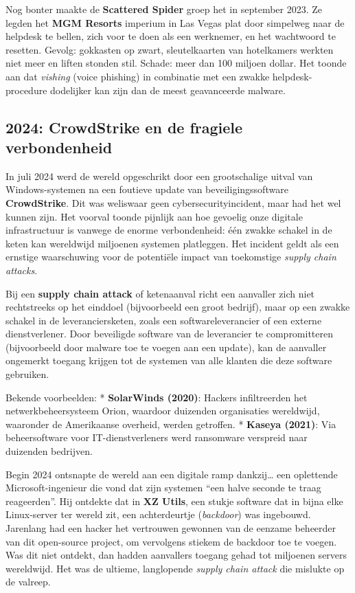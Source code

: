\documentclass[
  10pt,
  dutch,
  paper=a4,
  ,captions=tableheading
]{scrbook}
\begin{document}
Nog bonter maakte de \textbf{Scattered Spider} groep het in september
2023. Ze legden het \textbf{MGM Resorts} imperium in Las Vegas plat door
simpelweg naar de helpdesk te bellen, zich voor te doen als een
werknemer, en het wachtwoord te resetten. Gevolg: gokkasten op zwart,
sleutelkaarten van hotelkamers werkten niet meer en liften stonden stil.
Schade: meer dan 100 miljoen dollar. Het toonde aan dat \emph{vishing}
(voice phishing) in combinatie met een zwakke helpdesk-procedure
dodelijker kan zijn dan de meest geavanceerde malware.

\subsection{2024: CrowdStrike en de fragiele
verbondenheid}\label{crowdstrike-en-de-fragiele-verbondenheid}

In juli 2024 werd de wereld opgeschrikt door een grootschalige uitval
van Windows-systemen na een foutieve update van beveiligingssoftware
\textbf{CrowdStrike}. Dit was weliswaar geen cybersecurityincident, maar
had het wel kunnen zijn. Het voorval toonde pijnlijk aan hoe gevoelig
onze digitale infrastructuur is vanwege de enorme verbondenheid: één
zwakke schakel in de keten kan wereldwijd miljoenen systemen platleggen.
Het incident geldt als een ernstige waarschuwing voor de potentiële
impact van toekomstige \emph{supply chain attacks}.

\begin{tipblock}
Bij een \textbf{supply chain attack} of ketenaanval richt een aanvaller
zich niet rechtstreeks op het einddoel (bijvoorbeeld een groot bedrijf),
maar op een zwakke schakel in de leveranciersketen, zoals een
softwareleverancier of een externe dienstverlener. Door beveiligde
software van de leverancier te compromitteren (bijvoorbeeld door malware
toe te voegen aan een update), kan de aanvaller ongemerkt toegang
krijgen tot de systemen van alle klanten die deze software gebruiken.

Bekende voorbeelden: * \textbf{SolarWinds (2020)}: Hackers infiltreerden
het netwerkbeheersysteem Orion, waardoor duizenden organisaties
wereldwijd, waaronder de Amerikaanse overheid, werden getroffen. *
\textbf{Kaseya (2021)}: Via beheersoftware voor IT-dienstverleners werd
ransomware verspreid naar duizenden bedrijven.
\end{tipblock}

Begin 2024 ontsnapte de wereld aan een digitale ramp dankzij\ldots{} een
oplettende Microsoft-ingenieur die vond dat zijn systemen ``een halve
seconde te traag reageerden''. Hij ontdekte dat in \textbf{XZ Utils},
een stukje software dat in bijna elke Linux-server ter wereld zit, een
achterdeurtje (\emph{backdoor}) was ingebouwd. Jarenlang had een hacker
het vertrouwen gewonnen van de eenzame beheerder van dit open-source
project, om vervolgens stiekem de backdoor toe te voegen. Was dit niet
ontdekt, dan hadden aanvallers toegang gehad tot miljoenen servers
wereldwijd. Het was de ultieme, langlopende \emph{supply chain attack}
die mislukte op de valreep.
\end{document}
